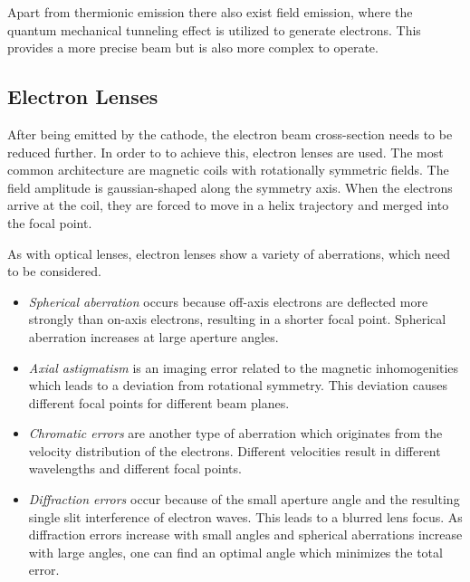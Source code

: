 Apart from thermionic emission there also exist field emission, where
the quantum mechanical tunneling effect is utilized to generate electrons.
This provides a more precise beam but is also more complex to operate.

\subsection{Electron Lenses}
After being emitted by the cathode, the electron beam cross-section 
needs to be reduced further. 
In order to to achieve this, electron lenses are used.
The most common architecture are magnetic coils with rotationally 
symmetric fields. 
The field amplitude is gaussian-shaped along the symmetry axis.
When the electrons arrive at the coil, they are forced to move in a helix 
trajectory and merged into the focal point. 

As with optical lenses, electron lenses show a variety of  
aberrations, which need to be considered.
\begin{itemize}
	\item \textit{Spherical aberration} occurs because off-axis electrons 
		are deflected more strongly than on-axis electrons, resulting in a 
		shorter focal point. Spherical aberration increases at large 
		aperture angles. 
	\item \textit{Axial astigmatism} is an imaging error related to the
		magnetic inhomogenities which leads to a deviation from rotational 
		symmetry. 
		This deviation causes different focal points for different beam 
		planes. 
	\item \textit{Chromatic errors} are another type of aberration 
		which originates from the velocity distribution of the electrons. 
		Different velocities result in different wavelengths and different
		focal points. 
	\item \textit{Diffraction errors} occur because of the small aperture
		angle and the resulting single slit interference of electron waves.
		This leads to a blurred lens focus.
		As diffraction errors increase with small angles and spherical 
		aberrations increase with large angles, one can find an optimal 
		angle which minimizes the total error. 
\end{itemize}




